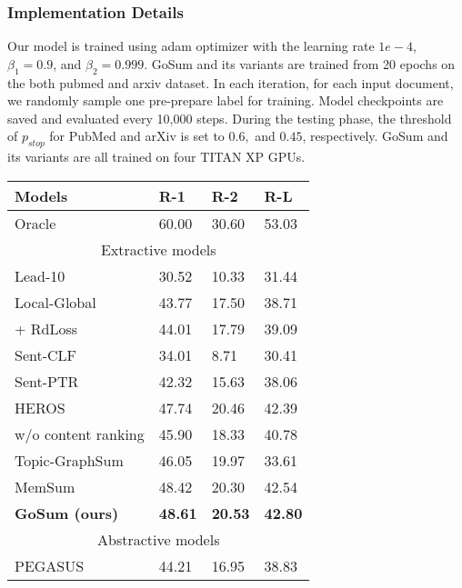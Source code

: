 \subsubsection{Implementation Details}
Our model is trained using adam\cite{adam_2015} optimizer with the learning rate $1e-4$, $\beta_1 = 0.9$, and $\beta_2=0.999$.
GoSum and its variants are trained from 20 epochs on the both pubmed and arxiv dataset.
In each iteration, for each input document, we randomly sample one pre-prepare label for training.
Model checkpoints are saved and evaluated every 10,000 steps.
During the testing phase, the threshold of $p_{stop}$ for PubMed and arXiv is set to $0.6,$ and $ 0.45$, respectively.
GoSum and its variants are all trained on four TITAN XP GPUs.

\begin{table}[t]
  \centering
  \begin{tabular}{p{36mm}|p{8mm}p{8mm}p{8mm}}\toprule
        Models          &  R-1  &  R-2  &  R-L   \\ \midrule
        Oracle                          & 60.00 & 30.60 & 53.03  \\  \midrule
        \multicolumn{4}{c}{Extractive models}  \\ \midrule
          Lead-10                       & 30.52 & 10.33 & 31.44  \\
          Local-Global                  & 43.77 & 17.50 & 38.71  \\
          \quad + RdLoss                & 44.01 & 17.79 & 39.09  \\
          Sent-CLF                      & 34.01 &  8.71 & 30.41  \\
          Sent-PTR                      & 42.32 & 15.63 & 38.06  \\
          HEROS                         & 47.74 & 20.46 & 42.39  \\
          \quad w/o content ranking     & 45.90 & 18.33 & 40.78  \\
          Topic-GraphSum                & 46.05 & 19.97 & 33.61  \\
          MemSum                        & 48.42 & 20.30 & 42.54  \\
          \textbf{GoSum (ours)}         & \textbf{48.61} & \textbf{20.53} & \textbf{42.80}  \\ \midrule
          \multicolumn{4}{c}{Abstractive models}  \\ \midrule
          PEGASUS                       & 44.21 & 16.95 & 38.83  \\

\end{tabular}
\end{table}
